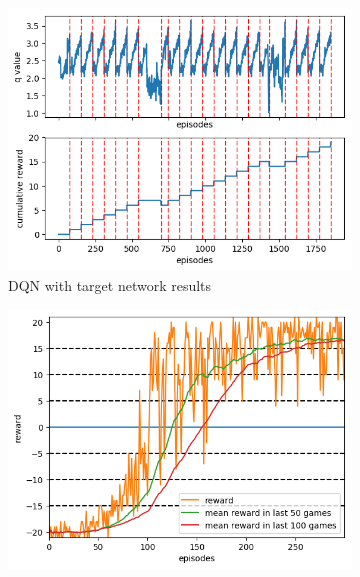 \documentclass[10pt]{article}
\begin{document}
\begin{figure}
\begin{subfigure}{0.49\textwidth}
\begin{minipage}{\linewidth}
			\includegraphics[width=\linewidth]{prior_DDQN_game.png}
		\end{minipage}\vfill
		\caption{DQN with target network results}
	\end{subfigure}
	\begin{subfigure}{0.49\textwidth}
		\centering
		\begin{minipage}{\linewidth}
			\includegraphics[width=\linewidth]{prior_duel_DDQN_reward.png}
		\end{minipage}\vfill
		\begin{minipage}{\linewidth}

\end{minipage}
\end{subfigure}
\end{figure}
\end{document}
